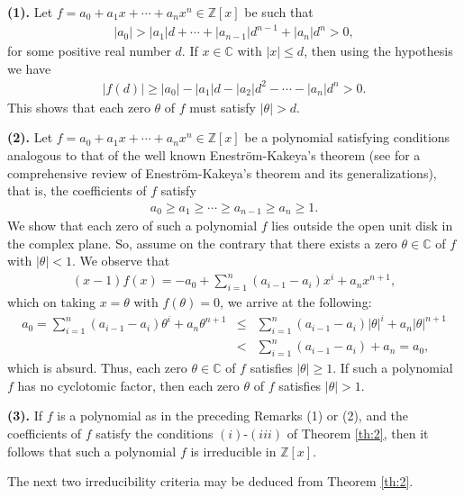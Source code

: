 \documentclass[12pt]{amsart}%
\begin{document}
\begin{remarks}\textbf{(1).}\label{r1} Let $f=a_0+a_1x+\cdots+a_n x^n\in \mathbb{Z}[x]$ be  such that
\begin{eqnarray*}
|a_0|>|a_1| d + \cdots + |a_{n-1}|d^{n-1}+ |a_n| d^n >0,
\end{eqnarray*}
for some positive real number $d$. If $x\in \mathbb{C}$ with $|x|\leq d$, then using the hypothesis we have
    \begin{eqnarray*}
|f(d)|\geq |a_0|-|a_1|d-|a_2|d^2-\cdots-|a_n|d^n>0.
    \end{eqnarray*}
This shows that each zero $\theta$ of $f$ must satisfy $|\theta|> d$.

\textbf{(2).}\label{r2} Let $f=a_0+a_1x+\cdots+a_n x^n\in \mathbb{Z}[x]$ be a polynomial satisfying conditions analogous to that of the well known Enestr\"om-Kakeya's theorem (see  \cite{Gardner} for a comprehensive review of Enestr\"om-Kakeya's theorem and its generalizations), that is, the coefficients of $f$ satisfy  
\begin{eqnarray*}
a_0\geq a_1\geq \cdots\geq a_{n-1}\geq a_n\geq 1.
\end{eqnarray*}
 We show that each zero of such a polynomial $f$ lies outside the open unit disk in the complex plane. So, assume on the contrary that there exists a zero $\theta \in \mathbb{C}$ of $f$ with $|\theta|<1$. We observe that
\begin{eqnarray*}
(x-1)f(x)=-a_0+\sum_{i=1}^n (a_{i-1}-a_i)x^i+a_n x^{n+1},
\end{eqnarray*}
which on taking $x=\theta$ with $f(\theta)=0$, we arrive at the following:
 \begin{eqnarray*}
 a_0=\sum_{i=1}^n (a_{i-1}-a_i)\theta^i+a_n \theta^{n+1}&\leq& \sum_{i=1}^n (a_{i-1}-a_i)|\theta|^i+a_n |\theta|^{n+1}\\&<&\sum_{i=1}^n (a_{i-1}-a_i)+a_n=a_0,
  \end{eqnarray*}
which is absurd. Thus, each zero $\theta\in \mathbb{C}$ of $f$ satisfies $|\theta|\geq 1$. If  such a polynomial $f$ has no cyclotomic factor, then each zero $\theta$ of $f$  satisfies $|\theta|>1$.

\textbf{(3).} If $f$ is a polynomial as in the preceding Remarks (1) or (2), and  the coefficients of $f$ satisfy the conditions $(i)$-$(iii)$ of Theorem \ref{th:2}, then it follows that such a polynomial $f$ is irreducible in $\mathbb{Z}[x]$.
\end{remarks}
 The next two irreducibility criteria may be deduced from Theorem \ref{th:2}.
\end{document}
